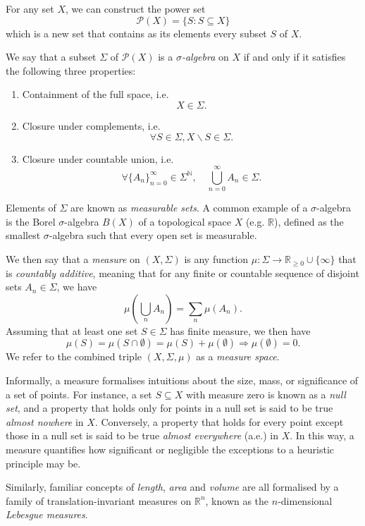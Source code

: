 \documentclass[honours,12pt]{unswthesis}
\def\implies{\Rightarrow}
\numberwithin{equation}{section}
\begin{document}
For any set $X$, we can construct the power set
$$\mathcal{P}(X) = \{S : S\subseteq X\}$$
which is a new set that contains as its elements every subset $S$ of $X$.

We say that a subset $\Sigma$ of $\mathcal{P}(X)$ is a  \textit{$\sigma$-algebra} on $X$ if and only if it satisfies the following three properties:
\begin{enumerate}
	\item Containment of the full space, i.e. $$X\in\Sigma.$$
	\item Closure under complements, i.e. $$\forall S \in \Sigma, X\backslash S\in\Sigma.$$
	\item Closure under countable union, i.e. $$\forall \{A_n\}_{n=0}^\infty\in\Sigma^{\mathbb{N}},\quad\bigcup_{n=0}^\infty A_n \in \Sigma.$$
\end{enumerate}
Elements of $\Sigma$ are known as \textit{measurable sets}. A common example of a $\sigma$-algebra is the Borel $\sigma$-algebra $B(X)$ of a topological space $X$ (e.g. $\mathbb{R}$), defined as the smallest $\sigma$-algebra such that every open set is measurable.

We then say that a \textit{measure} on $(X,\Sigma)$ is any function $\mu:\Sigma\to\mathbb{R}_{\geq 0}\cup\{\infty\}$ that is \textit{countably additive}, meaning that for any finite or countable sequence of disjoint sets $A_n\in\Sigma$, we have
$$\mu\left(\bigcup_n A_n\right) = \sum_n \mu(A_n).$$
Assuming that at least one set $S\in\Sigma$ has finite measure, we then have $$\mu(S)=\mu(S\cap\emptyset)=\mu(S)+\mu(\emptyset) \implies \mu(\emptyset)=0.$$
We refer to the combined triple $(X,\Sigma,\mu)$ as a \textit{measure space}.

Informally, a measure formalises intuitions about the size, mass, or significance of a set of points. For instance, a set $S\subseteq X$ with measure zero is known as a \textit{null set}, and a property that holds only for points in a null set is said to be true \textit{almost nowhere} in $X$. Conversely, a property that holds for every point except those in a null set is said to be true \textit{almost everywhere} (a.e.) in $X$. In this way, a measure quantifies how significant or negligible the exceptions to a heuristic principle may be.

Similarly, familiar concepts of \textit{length}, \textit{area} and \textit{volume} are all formalised by a family of translation-invariant measures on $\mathbb{R}^n$, known as the $n$-dimensional \textit{Lebesgue measures}.
\end{document}
